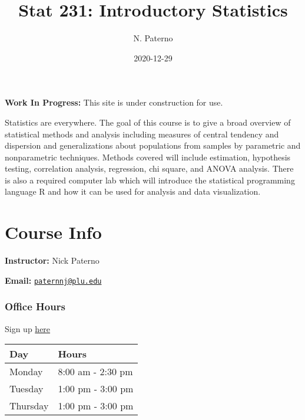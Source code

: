 \documentclass[
]{book}
\title{Stat 231: Introductory Statistics}
\author{N. Paterno}
\date{2020-12-29}
\begin{document}
\maketitle

{
\setcounter{tocdepth}{1}
\tableofcontents
}
\hypertarget{section}{%
\chapter*{}\label{section}}

\textbf{Work In Progress:}
This site is under construction for use.

\[ \]
Statistics are everywhere. The goal of this course is to give a broad overview of statistical methods and analysis including measures of central tendency and dispersion and generalizations about populations from samples by parametric and nonparametric techniques. Methods covered will include estimation, hypothesis testing, correlation analysis, regression, chi square, and ANOVA analysis. There is also a required computer lab which will introduce the statistical programming language R and how it can be used for analysis and data visualization.

\hypertarget{info}{%
\chapter{Course Info}\label{info}}



\textbf{Instructor:} Nick Paterno

\textbf{Email:} \href{mailto:paternnj@plu.edu}{\nolinkurl{paternnj@plu.edu}}

\hypertarget{office-hours}{%
\subsection{Office Hours}\label{office-hours}}

Sign up \href{https://calendar.google.com/calendar/u/0/selfsched?sstoken=UUEtUG1vWXBzQWVnfGRlZmF1bHR8MDkxZTNlNTE2MzdjYTI4ZTY2MmFkNmRlZjI0OTNlNDI}{here}

\begin{tabular}{l|l}
\hline
Day & Hours\\
\hline
Monday & 8:00 am - 2:30 pm\\
\hline
Tuesday & 1:00 pm - 3:00 pm\\
\hline
Thursday & 1:00 pm - 3:00 pm\\
\hline
\end{tabular}
\end{document}
